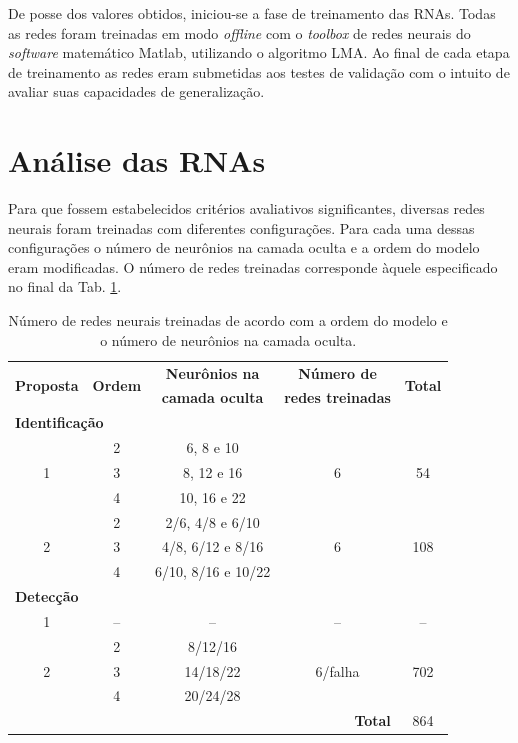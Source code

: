 De posse dos valores obtidos, iniciou-se a fase de treinamento das RNAs. Todas
as redes foram treinadas em modo {\it offline} com o {\it toolbox} de redes
neurais do {\it software} matemático Matlab\reg, utilizando o algoritmo LMA. Ao
final de cada etapa de treinamento as redes eram submetidas aos testes de
validação com o intuito de avaliar suas capacidades de generalização.

\section{Análise das RNAs}
Para que fossem estabelecidos critérios avaliativos significantes, diversas
redes neurais foram treinadas com diferentes configurações. Para cada uma dessas
configurações o número de neurônios na camada oculta e a ordem do modelo eram
modificadas. O número de redes treinadas corresponde àquele especificado no
final da Tab. \ref{tab:treinamentos}. 

\begin{table}[htb]
\small
\centering
\caption[Número de redes neurais treinadas]{Número de redes neurais treinadas de
acordo com a ordem do modelo e o número de neurônios na camada oculta.}
\label{tab:treinamentos}
\vspace{0.25cm}
\begin{tabular}{|c|c|c|c|c|}
\hline
\multirow{2}{*}{\bf Proposta} & 
\multirow{2}{*}{\bf Ordem} & 
{\bf Neurônios na} & 
{\bf Número de} & 
\multirow{2}{*}{\bf Total}\\
& & {\bf camada oculta} & {\bf redes treinadas} &\\
\hline
\hline
\multicolumn{5}{|l|}{{\bf Identificação}}\\
\hline
\multirow{3}{*}{1} & 2 & 6, 8 e 10 & \multirow{3}{*}{6} & \multirow{3}{*}{54}\\
\cline{2-3}
& 3 & 8, 12 e 16 & &\\
\cline{2-3}
& 4 & 10, 16 e 22 & &\\
\hline
\multirow{3}{*}{2} & 2 & 2/6, 4/8 e 6/10 & 
\multirow{3}{*}{6} & \multirow{3}{*}{108}\\
\cline{2-3}
& 3 & 4/8, 6/12 e 8/16 & & \\
\cline{2-3}
& 4 & 6/10, 8/16 e 10/22 & & \\
\hline
\multicolumn{5}{|l|}{{\bf Detecção}}\\
\hline
1 & -- & -- & -- & --\\
\hline
\multirow{3}{*}{2} & 
2 & 8/12/16 & 
\multirow{3}{*}{6/falha} &
\multirow{3}{*}{702}\\
\cline{2-3}
& 3 & 14/18/22 & &\\
\cline{2-3}
& 4 & 20/24/28 & &\\
\hline
\hline
\multicolumn{4}{|r|}{{\bf Total}} & 864\\
\hline
\end{tabular}
\end{table}

